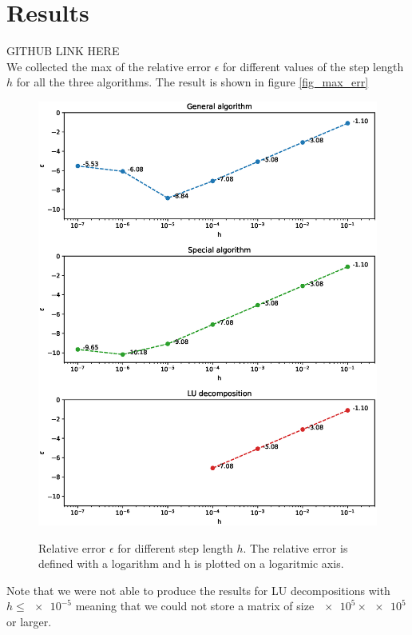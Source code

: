 \documentclass[american,a4paper,12pt]{article}
\begin{document}
\section{Results}
  GITHUB LINK HERE \\
  We collected the max of the relative error $\epsilon$ for different values of the step length $h$ for all the three algorithms. The result is shown in figure \ref{fig_max_err}
  \begin{figure}[H]
  \begin{center}
    \includegraphics[width = \textwidth]{figures/max_err.eps} \\
    \caption{Relative error $\epsilon$ for different step length $h$. The relative error is defined with a logarithm and h is plotted on a logaritmic axis.}
    \label{fig:max_err}
    \end{center}
  \end{figure}
  Note that we were not able to produce the results for LU decompositions with $h \le \num{e-5}$ meaning that we could not store a matrix of size $\num{e5} \times \num{e5}$ or larger. \\
\end{document}
